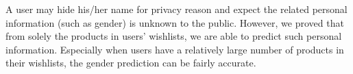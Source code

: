 A user may hide his/her name for privacy reason and expect the related personal information (such as gender) is unknown to the public. However, we proved that from solely the products in users' wishlists, we are able to predict such personal information. Especially when users have a relatively large number of products in their wishlists, the gender prediction can be fairly accurate. 







